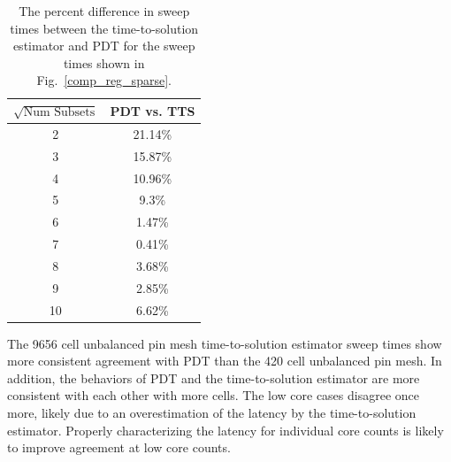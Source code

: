 \documentclass[times,final]{elsarticle}
\begin{document}
\begin{table}[h]
\centering
\caption{The percent difference in sweep times between the time-to-solution estimator and PDT for the sweep times shown in Fig.~\ref{comp_reg_sparse}.}
\label{diff_reg_sparse}
\begin{tabular}{c|c}
\textbf{$\sqrt{\text{Num Subsets}}$} & \bf PDT vs. TTS \\ \hline 
2&21.14\%\\ \hline 
3&15.87\%\\ \hline 
4&10.96\%\\ \hline 
5&9.3\%\\ \hline 
6&1.47\%\\ \hline 
7&0.41\%\\ \hline 
8&3.68\%\\ \hline 
9&2.85\%\\ \hline 
10&6.62\%
\end{tabular}
\end{table}

The 9656 cell unbalanced pin mesh time-to-solution estimator sweep times show more consistent agreement with PDT than the 420 cell unbalanced pin mesh.
In addition, the behaviors of PDT and the time-to-solution estimator are more consistent with each other with more cells.
The low core cases disagree once more, likely due to an overestimation of the latency by the time-to-solution estimator.
Properly characterizing the latency for individual core counts is likely to improve agreement at low core counts. 

\FloatBarrier
\end{document}
